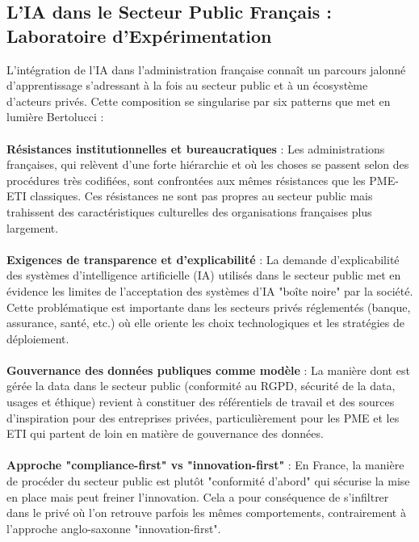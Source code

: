 \subsection{L'IA dans le Secteur Public Français : Laboratoire d'Expérimentation}

L’intégration de l’IA dans l’administration française connaît un parcours jalonné d’apprentissage s’adressant à la fois au secteur public et à un écosystème d’acteurs privés. Cette composition se singularise par six patterns que met en lumière Bertolucci \cite{bertolucci2024artificial}:
\\\\
\textbf{Résistances institutionnelles et bureaucratiques} : Les administrations françaises, qui relèvent d’une forte hiérarchie et où les choses se passent selon des procédures très codifiées, sont confrontées aux mêmes résistances que les PME-ETI classiques. Ces résistances ne sont pas propres au secteur public mais trahissent des caractéristiques culturelles des organisations françaises plus largement.
\\\\
\textbf{Exigences de transparence et d'explicabilité} : La demande d'explicabilité des systèmes d'intelligence artificielle (IA) utilisés dans le secteur public met en évidence les limites de l'acceptation des systèmes d'IA "boîte noire" par la société.
Cette problématique est importante dans les secteurs privés réglementés (banque, assurance, santé, etc.) où elle oriente les choix technologiques et les stratégies de déploiement.
\\\\
\textbf{Gouvernance des données publiques comme modèle} : La manière dont est gérée la data dans le secteur public (conformité au RGPD, sécurité de la data, usages et éthique) revient à constituer des référentiels de travail et des sources d'inspiration pour des entreprises privées, particulièrement pour les PME et les ETI qui partent de loin en matière de gouvernance des données.
\\\\
\textbf{Approche "compliance-first" vs "innovation-first"} : En France, la manière de procéder du secteur public est plutôt "conformité d'abord" qui sécurise la mise en place mais peut freiner l'innovation. Cela a pour conséquence de s'infiltrer dans le privé où l'on retrouve parfois les mêmes comportements, contrairement à l'approche anglo-saxonne "innovation-first".

